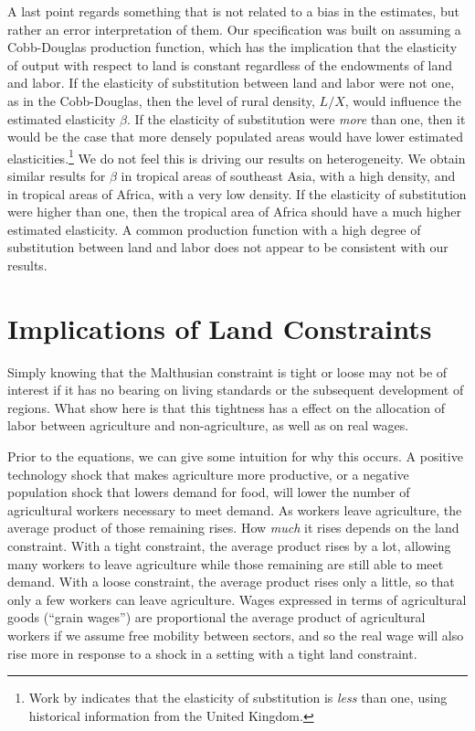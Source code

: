 \documentclass[11pt]{article}
\begin{document}
A last point regards something that is not related to a bias in the estimates, but rather an error interpretation of them. Our specification was built on assuming a Cobb-Douglas production function, which has the implication that the elasticity of output with respect to land is constant regardless of the endowments of land and labor. If the elasticity of substitution between land and labor were not one, as in the Cobb-Douglas, then the level of rural density, $L/X$, would influence the estimated elasticity $\beta$. If the elasticity of substitution were \textit{more} than one, then it would be the case that more densely populated areas would have lower estimated elasticities.\footnote{Work by \citet{wilde2012} indicates that the elasticity of substitution is \textit{less} than one, using historical information from the United Kingdom.} We do not feel this is driving our results on heterogeneity. We obtain similar results for $\beta$ in tropical areas of southeast Asia, with a high density, and in tropical areas of Africa, with a very low density. If the elasticity of substitution were higher than one, then the tropical area of Africa should have a much higher estimated elasticity. A common production function with a high degree of substitution between land and labor does not appear to be consistent with our results.

\section{Implications of Land Constraints}
Simply knowing that the Malthusian constraint is tight or loose may not be of interest if it has no bearing on living standards or the subsequent development of regions. What show here is that this tightness has a effect on the allocation of labor between agriculture and non-agriculture, as well as on real wages.

Prior to the equations, we can give some intuition for why this occurs. A positive technology shock that makes agriculture more productive, or a negative population shock that lowers demand for food, will lower the number of agricultural workers necessary to meet demand. As workers leave agriculture, the average product of those remaining rises. How \textit{much} it rises depends on the land constraint. With a tight constraint, the average product rises by a lot, allowing many workers to leave agriculture while those remaining are still able to meet demand. With a loose constraint, the average product rises only a little, so that only a few workers can leave agriculture. Wages expressed in terms of agricultural goods (``grain wages'') are proportional the average product of agricultural workers if we assume free mobility between sectors, and so the real wage will also rise more in response to a shock in a setting with a tight land constraint.
\end{document}
